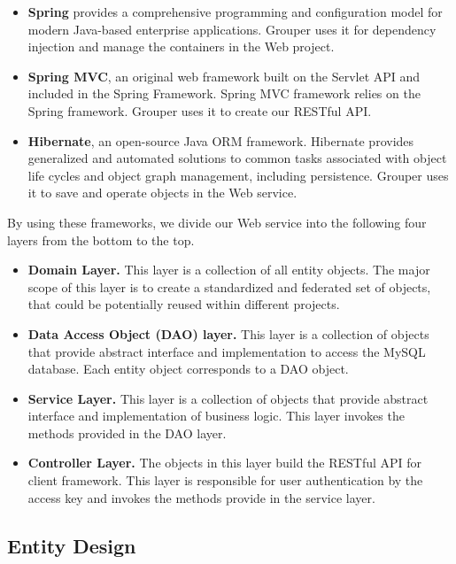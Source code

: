 \documentclass[a4paper,11pt]{report}
\begin{document}
\begin{itemize}[leftmargin=7mm]
	\setlength{\itemsep}{1pt}
	\setlength{\parskip}{0pt}
	\setlength{\parsep}{0pt}
	\item 
	\textbf{Spring}\cite{spring} provides a comprehensive programming and configuration model for modern Java-based enterprise applications.
	Grouper uses it for dependency injection and manage the containers in the Web project.
	\item 
	\textbf{Spring MVC}\cite{spring}, an original web framework built on the Servlet API and included in the Spring Framework.
	Spring MVC framework relies on the Spring framework.
	Grouper uses it to create our RESTful API.
	\item 
	\textbf{Hibernate}\cite{hibernate}, an open-source Java ORM framework.
	Hibernate provides generalized and automated solutions to common tasks associated with object life cycles and object graph management, including persistence. 
	Grouper uses it to save and operate objects in the Web service.
\end{itemize}

By using these frameworks, we divide our Web service into the following four layers from the bottom to the top.

\begin{itemize}[leftmargin=7mm]
	\setlength{\itemsep}{1pt}
	\setlength{\parskip}{0pt}
	\setlength{\parsep}{0pt}
	\item 
	\textbf{Domain Layer.}
	This layer is a collection of all entity objects.
	The major scope of this layer is to create a standardized and federated set of objects, that could be potentially reused within different projects.
	\item 
	\textbf{Data Access Object (DAO) layer.}
	This layer is a collection of objects that provide abstract interface and implementation to access the MySQL database. 
	Each entity object corresponds to a DAO object.
	\item 
	\textbf{Service Layer.}
	This layer is a collection of objects that provide abstract interface and implementation of business logic.
	This layer invokes the methods provided in the DAO layer.
	\item 
	\textbf{Controller Layer.}
	The objects in this layer build the RESTful API for client framework.
	This layer is responsible for user authentication by the access key and invokes the methods provide in the service layer.
\end{itemize}

\subsection{Entity Design}
\end{document}
